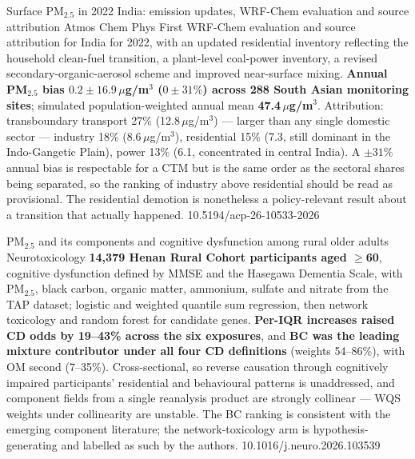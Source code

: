 \documentclass[10pt]{article}
\begin{document}
{Surface PM$_{2.5}$ in 2022 India: emission updates, WRF-Chem evaluation and source
attribution}
{Atmos Chem Phys}
{First WRF-Chem evaluation and source attribution for India for 2022, with an updated
residential inventory reflecting the household clean-fuel transition, a plant-level
coal-power inventory, a revised secondary-organic-aerosol scheme and improved
near-surface mixing. \textbf{Annual PM$_{2.5}$ bias $0.2 \pm 16.9$\,$\mu$g/m$^3$
($0 \pm 31\%$) across 288 South Asian monitoring sites}; simulated population-weighted
annual mean \textbf{47.4\,$\mu$g/m$^3$}. Attribution: transboundary transport 27\%
(12.8\,$\mu$g/m$^3$) --- larger than any single domestic sector --- industry 18\%
(8.6\,$\mu$g/m$^3$), residential 15\% (7.3, still dominant in the Indo-Gangetic Plain),
power 13\% (6.1, concentrated in central India). A $\pm 31\%$ annual bias is respectable
for a CTM but is the same order as the sectoral shares being separated, so the ranking of
industry above residential should be read as provisional. The residential demotion is
nonetheless a policy-relevant result about a transition that actually happened.}
{10.5194/acp-26-10533-2026}

\clearpage


{PM$_{2.5}$ and its components and cognitive dysfunction among rural older adults}
{Neurotoxicology}
{\textbf{14{,}379 Henan Rural Cohort participants aged $\geq$60}, cognitive dysfunction
defined by MMSE and the Hasegawa Dementia Scale, with PM$_{2.5}$, black carbon, organic
matter, ammonium, sulfate and nitrate from the TAP dataset; logistic and weighted
quantile sum regression, then network toxicology and random forest for candidate genes.
\textbf{Per-IQR increases raised CD odds by 19--43\% across the six exposures}, and
\textbf{BC was the leading mixture contributor under all four CD definitions} (weights
54--86\%), with OM second (7--35\%). Cross-sectional, so reverse causation through
cognitively impaired participants' residential and behavioural patterns is unaddressed,
and component fields from a single reanalysis product are strongly collinear --- WQS
weights under collinearity are unstable. The BC ranking is consistent with the emerging
component literature; the network-toxicology arm is hypothesis-generating and labelled as
such by the authors.}
{10.1016/j.neuro.2026.103539}
\end{document}
